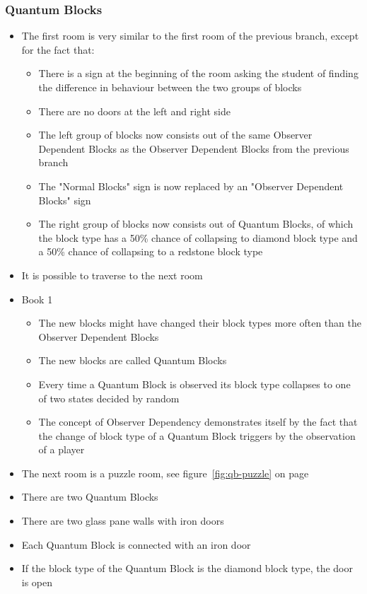 \documentclass[11pt,twoside]{report} %
\begin{document}
\subsubsection{Quantum Blocks}
\begin{itemize}
	\item The first room is very similar to the first room of the previous branch, except for the fact that:
	\begin{itemize}
		\item There is a sign at the beginning of the room asking the student of finding the difference in behaviour between the two groups of blocks
		\item There are no doors at the left and right side
		\item The left group of blocks now consists out of the same Observer Dependent Blocks as the Observer Dependent Blocks from the previous branch
		\item The "Normal Blocks" sign is now replaced by an "Observer Dependent Blocks" sign
		\item The right group of blocks now consists out of Quantum Blocks, of which the block type has a 50\% chance of collapsing to diamond block type and a 50\% chance of collapsing to a redstone block type
	\end{itemize}
	\item It is possible to traverse to the next room
	\item Book 1
	\begin{itemize}
		\item The new blocks might have changed their block types more often than the Observer Dependent Blocks
		\item The new blocks are called Quantum Blocks
		\item Every time a Quantum Block is observed its block type collapses to one of two states decided by random
		\item The concept of Observer Dependency demonstrates itself by the fact that the change of block type of a Quantum Block triggers by the observation of a player
	\end{itemize}
	\item The next room is a puzzle room, see figure~\ref{fig:qb-puzzle} on page~\pageref{fig:qb-puzzle}
	\item There are two Quantum Blocks
	\item There are two glass pane walls with iron doors
	\item Each Quantum Block is connected with an iron door
	\item If the block type of the Quantum Block is the diamond block type, the door is open

\end{itemize}
\end{document}
